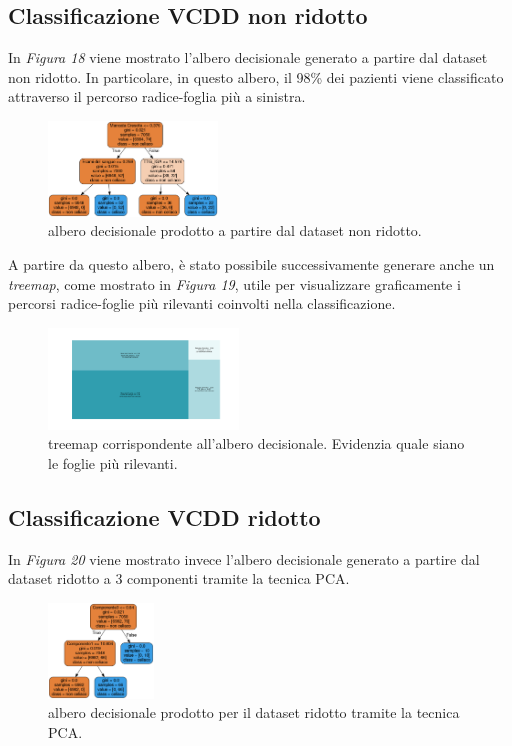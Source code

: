 \documentclass[11pt,a4paper,twocolumn]{article}
\begin{document}
\subsection{Classificazione VCDD non ridotto}
In \emph{Figura 18} viene mostrato l'albero decisionale generato a partire dal dataset non ridotto. In particolare, in questo albero, il 98\% dei pazienti viene classificato attraverso il percorso radice-foglia più a sinistra.

\begin{figure}[H]
	\centering
	\includegraphics[width=0.4\textwidth]{img/decision_tree.png}
	\caption{albero decisionale prodotto a partire dal dataset non ridotto.}
\end{figure}

A partire da questo albero, è stato possibile successivamente generare anche un \emph{treemap}, come mostrato in \emph{Figura 19}, utile per visualizzare graficamente i percorsi radice-foglie più rilevanti coinvolti nella classificazione.
\begin{figure}[H]
	\centering
	\includegraphics[width=0.45\textwidth]{img/treemap.png}
	\caption{treemap corrispondente all'albero decisionale. Evidenzia quale siano le foglie più rilevanti.}
\end{figure}

\subsection{Classificazione VCDD ridotto}
In \emph{Figura 20} viene mostrato invece l'albero decisionale generato a partire dal dataset ridotto a 3 componenti tramite la tecnica PCA.
\begin{figure}[H]
	\centering
	\includegraphics[width=0.25\textwidth]{img/decision_tree_PCA.png}
	\caption{albero decisionale prodotto per il dataset ridotto tramite la tecnica PCA.}
\end{figure}
\end{document}
